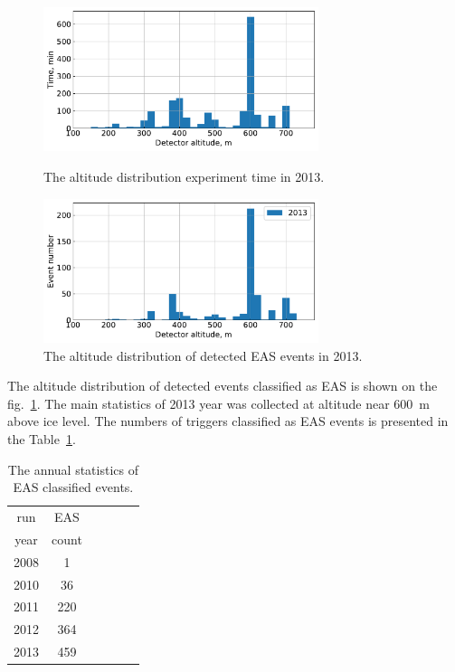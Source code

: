 \documentclass[final,5p,times,twocolumn]{elsarticle}
\begin{document}
\begin{figure}[t]
    \includegraphics[width=19pc]{figs/time_on_altitude.pdf}\hspace{2pc}%
    \caption{The altitude distribution experiment time in 2013.}
    \label{fig:time_on_altitude}
    \includegraphics[width=19pc]{figs/height_eas.pdf}\hspace{2pc}%
    \caption{The altitude distribution of detected EAS events in 2013.}
    \label{fig:height_eas}
\end{figure}


The altitude distribution of detected events classified as EAS is shown on the fig.~\ref{fig:height_eas}. The main statistics of 2013 year was collected at altitude near 600~m above ice level. The numbers of triggers classified as EAS events is presented in the Table~\ref{tab:EASstatistics}.


\begin{table}[ht]
    \centering
    \caption{The annual statistics of EAS classified events.}
    \label{tab:EASstatistics}
    \vspace{1pc}
    \begin{tabular}{|c||c|r|c|r|r|}
    \hline
    run  &  EAS\\ 
    year &  count\\ 
    \hline \hline
    2008 &   1\\  
    2010 &  36\\
    2011 & 220\\
    2012 & 364\\
    2013 & 459\\
    \hline
    \end{tabular}
\end{table}
\end{document}
